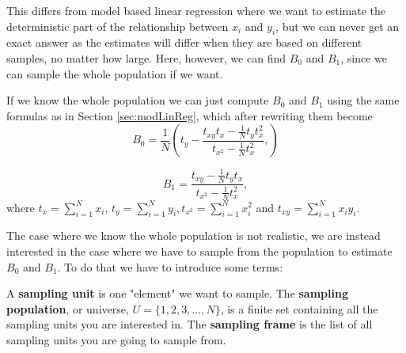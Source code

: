 \documentclass{article}
\begin{document}
This differs from model based linear regression where we want to estimate the
deterministic part of the relationship between \(x_i\) and \(y_i\), but we can
never get an exact answer as the estimates will differ when they are based on
different samples, no matter how large. Here, however, we can find \(B_0\) and
\(B_1\), since we can sample the whole population if we want.

If we know the whole population we can just compute \(B_0\) and \(B_1\) using the same formulas
as in Section \ref{sec:modLinReg}, which after rewriting them become
\begin{equation*}
 B_0 = \frac{1}{N} \left( t_y - \frac{t_{xy} t_x - \frac{1}{N} t_y t_x^2}
   {t_{x^2} - \frac{1}{N} t_x^2},
  \right)
\end{equation*}

\begin{equation*}
 B_1 = \frac{t_{xy} - \frac{1}{N} t_y t_x}
   {t_{x^2} - \frac{1}{N} t_x^2},
\end{equation*}
where \(t_x = \sum_{i = 1}^N x_i\), \(t_y = \sum_{i = 1}^N y_i, t_{x^2} =
\sum_{i = 1}^N x_i^2\) and \(t_{xy} =
\sum_{i = 1}^N x_i y_i\).

The case where we know the whole population is not realistic, we are instead interested in the case where we have to sample from the
population to estimate \(B_0\) and \(B_1\). To do that we have to introduce some terms:

\begin{definition} \label{def:sampUnitPopFrame}
 A \textbf{sampling unit} is one "element" we want to sample.
 The \textbf{sampling population}, or universe, \(U = \{1, 2, 3, ..., N\}\), is a
 finite set containing all the sampling units you are interested in. 
 The \textbf{sampling frame} is the list of all sampling units you are going to sample from. 
\end{definition}
\end{document}
